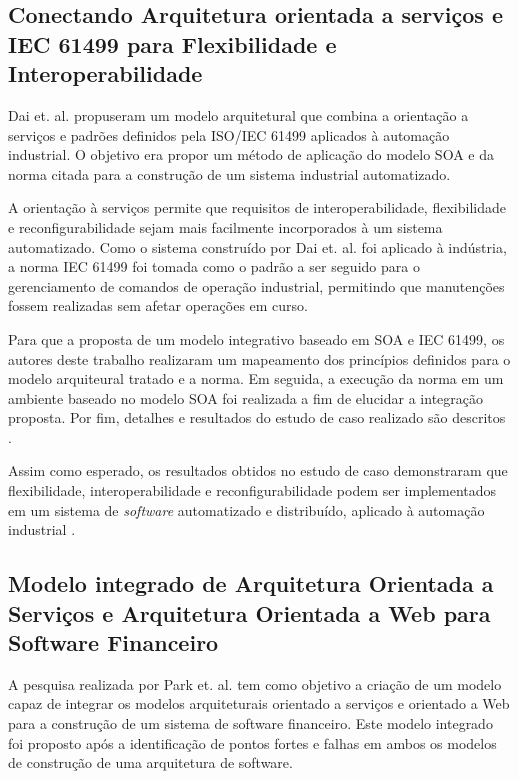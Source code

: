 \subsection{Conectando Arquitetura orientada a serviços e IEC 61499 para Flexibilidade e Interoperabilidade}

Dai et. al. \cite{dai_bridging_2015} propuseram um modelo arquitetural que combina a orientação a serviços e padrões definidos pela ISO/IEC 61499 aplicados à automação industrial. O objetivo era propor um método de aplicação do modelo SOA e da norma citada para a construção de um sistema industrial automatizado.

A orientação à serviços permite que requisitos de interoperabilidade, flexibilidade e reconfigurabilidade sejam mais facilmente incorporados à um sistema automatizado. Como o sistema construído por Dai et. al. \cite{dai_bridging_2015} foi aplicado à indústria, a norma IEC 61499 foi tomada como o padrão a ser seguido para o gerenciamento de comandos de operação industrial, permitindo que manutenções fossem realizadas sem afetar operações em curso.

Para que a proposta de um modelo integrativo baseado em SOA e IEC 61499, os autores deste trabalho realizaram um mapeamento dos princípios definidos para o modelo arquiteural tratado e a norma. Em seguida, a execução da norma em um ambiente baseado no modelo SOA foi realizada a fim de elucidar a integração proposta. Por fim, detalhes e resultados do estudo de caso realizado são descritos \cite{dai_bridging_2015}.

Assim como esperado, os resultados obtidos no estudo de caso demonstraram que flexibilidade, interoperabilidade e reconfigurabilidade podem ser implementados em um sistema de \textit{software} automatizado e distribuído, aplicado à automação industrial \cite{dai_bridging_2015}.


\subsection{Modelo integrado de Arquitetura Orientada a Serviços e Arquitetura Orientada a Web para Software Financeiro}
A pesquisa realizada por Park et. al. \cite{park_integrated_2012} tem como objetivo a criação de um modelo capaz de integrar os modelos arquiteturais orientado a serviços e orientado a Web para a construção de um sistema de software financeiro. Este modelo integrado foi proposto após a identificação de pontos fortes e falhas em ambos os modelos de construção de uma arquitetura de software.

